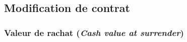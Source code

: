 \documentclass[10pt, french]{article}
\begin{document}
\begin{multicols*}{2}
\subsection*{Modification de contrat}
\subsubsection*{Valeur de rachat (\emph{Cash value at surrender})}









\end{multicols*}
\end{document}
